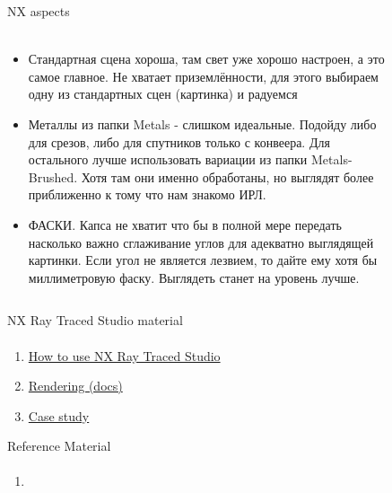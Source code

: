 \documentclass[aspectratio=169]{beamer}
\newcommand{\fbckg}[1]{\usebackgroundtemplate{\texttt{[image: \#1]}}}%
\begin{document}
\begin{frame}[t]{NX aspects}
\framesubtitle{}
\begin{columns}[T,onlytextwidth]
    \begin{column}{0.69\textwidth}
        \begin{itemize}
            \scriptsize
            \item Стандартная сцена хороша, там свет уже хорошо настроен, а это самое главное. Не хватает приземлённости, для этого выбираем одну из стандартных сцен (картинка) и радуемся
            \item Металлы из папки Metals - слишком идеальные. Подойду либо для срезов, либо для спутников только с конвеера. Для остального лучше использовать вариации из папки Metals-Brushed. Хотя там они именно обработаны, но выглядят более приближенно к тому что нам знакомо ИРЛ.
            \item ФАСКИ. Капса не хватит что бы в полной мере передать насколько важно сглаживание углов для адекватно выглядящей картинки. Если угол не является лезвием, то дайте ему хотя бы миллиметровую фаску. Выглядеть станет на уровень лучше.
        \end{itemize}
    \end{column}
    \begin{column}{0.29\textwidth}
        \begin{figure}[H]
            \centering\includegraphics[height=5.5cm,width=1\textwidth,keepaspectratio]{standard_scence.jpg}
            \label{fig:standard_scence.jpg}
        \end{figure}
    \end{column}
\end{columns}
\end{frame}

\begin{frame}[t]{NX Ray Traced Studio material}
\framesubtitle{}
    \begin{enumerate}
        \item \href{https://youtu.be/uyGHuxEY5Gk}{How to use NX Ray Traced Studio}
        \item \href{https://docs.sw.siemens.com/en-US/doc/209349590/PL20200605195244930.viewing_rendering/xid1219739}{Rendering (docs)}
        \item \href{https://youtu.be/qPT449FupKU}{Case study}
    \end{enumerate}
\end{frame}

\begin{frame}[t]{Reference Material}
\framesubtitle{}
\footnotesize
\begin{enumerate}
    \item \ 
\end{enumerate}
    
\end{frame}

\fbckg{fibeamer/figs/last_page.png}
\frame[plain]{}
\end{document}

